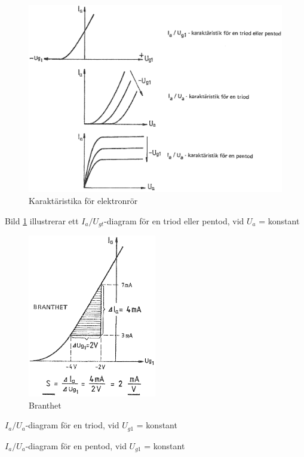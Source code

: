 \begin{figure}
\includegraphics[width=\textwidth]{images/cropped_pdfs/bild_2_2-32.pdf}
\caption{Karaktäristika för elektronrör}
\label{fig:BildII2-32}
\end{figure}

Bild \ref{fig:BildII2-32} illustrerar ett \(I_a/U_{gt}\)-diagram för en triod
eller pentod, vid \(U_a\) = konstant

\begin{figure}
\includegraphics[width=0.5\textwidth]{images/cropped_pdfs/bild_2_2-33.pdf}
\caption{Branthet}
\label{fig:BildII2-33}
\end{figure}

\(I_a/U_a\)-diagram för en triod, vid \(U_{g1}\) = konstant

\(I_a/U_a\)-diagram för en pentod, vid \(U_{g1}\) = konstant

